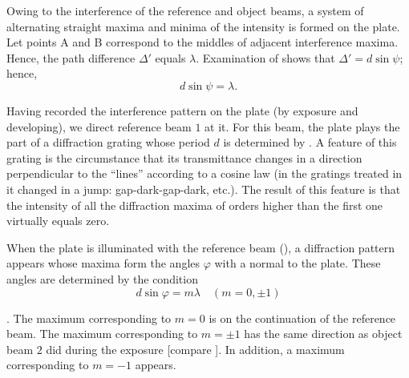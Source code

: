 Owing to the interference of the reference and object beams, a system of alternating straight maxima and minima of the intensity is formed on the plate.
Let points A and B correspond to the middles of adjacent interference maxima.
Hence, the path difference $\Delta'$ equals $\lambda$.
Examination of  shows that $\Delta'= d\sin\psi$; hence,
\begin{equation}\label{eq:18_69}
	d \sin\psi = \lambda.
\end{equation}

Having recorded the interference pattern on the plate (by exposure and developing), we direct reference beam $1$ at it.
For this beam, the plate plays the part of a diffraction grating whose period $d$ is determined by .
A feature of this grating is the circumstance that its transmittance changes in a direction perpendicular to the ``lines'' according to a cosine law (in the gratings treated in  it changed in a jump: gap-dark-gap-dark, etc.).
The result of this feature is that the intensity of all the diffraction maxima of orders higher than the first one virtually equals zero.

When the plate is illuminated with the reference beam (), a diffraction pattern appears whose maxima form the angles $\varphi$ with a normal to the plate.
These angles are determined by the condition
\begin{equation}\label{eq:18_70}
	d \sin\varphi = m \lambda \quad (m=0, \pm 1)
\end{equation}

.
The maximum corresponding to $m=0$ is on the continuation of the reference beam.
The maximum corresponding to $m=\pm 1$ has the same direction as object beam $2$ did during the exposure [compare ].
In addition, a maximum corresponding to $m=-1$ appears.


